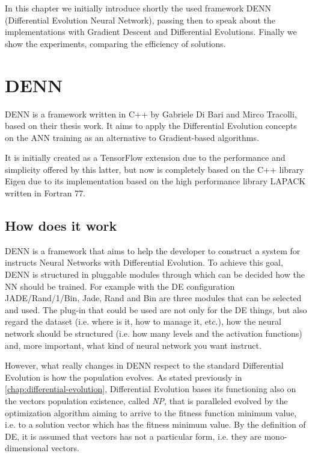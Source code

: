 In this chapter we initially introduce shortly the used framework DENN (Differential Evolution Neural Network), passing then to speak about the implementations with Gradient Descent and Differential Evolutions. Finally we show the experiments, comparing the efficiency of solutions.

\section{DENN}\label{sec:DENN}
DENN is a framework written in C++ by Gabriele Di Bari and Mirco Tracolli, based on their thesis work. It aims to apply the Differential Evolution concepts on the ANN training as an alternative to Gradient-based algorithms. 

It is initially created as a TensorFlow extension due to the performance and simplicity offered by this latter, but now is completely based on the C++ library Eigen due to its implementation based on the high performance library LAPACK written in Fortran 77.

\subsection{How does it work}
DENN is a framework that aims to help the developer to construct a system for instructs Neural Networks with Differential Evolution. To achieve this goal, DENN is structured in pluggable modules through which can be decided how the NN should be trained. For example with the DE configuration JADE/Rand/1/Bin, Jade, Rand and Bin are three modules that can be selected and used. The plug-in that could be used are not only for the DE things, but also regard the dataset (i.e. where is it, how to manage it, etc.), how the neural network should be structured (i.e. how many levels and the activation functions) and, more important, what kind of neural network you want instruct.

However, what really changes in DENN respect to the standard Differential Evolution is how the population evolves. As stated previously in \ref{chap:differential-evolution}, Differential Evolution bases its functioning also on the vectors population existence, called \textit{NP}, that is paralleled evolved by the optimization algorithm aiming to arrive to the fitness function minimum value, i.e. to a solution vector which has the fitness minimum value. By the definition of DE, it is assumed that vectors has not a particular form, i.e. they are mono-dimensional vectors. 


